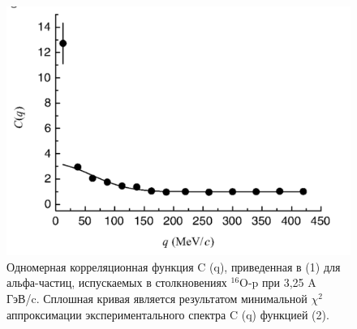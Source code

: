 \documentclass[fontsize=14pt]{scrarticle}
\begin{document}
\begin{figure}[!ht]
\centerline{\includegraphics[scale=.5]{picture8.png}}
\caption{Одномерная корреляционная функция C (q), приведенная в (1) для альфа-частиц, испускаемых в столкновениях $^{16}$O-p при 3,25 A ГэВ/c. Сплошная кривая является результатом минимальной $\chi^{2}$ аппроксимации экспериментального спектра C (q) функцией (2).}
\label{fig12}
\end{figure}
\end{document}
